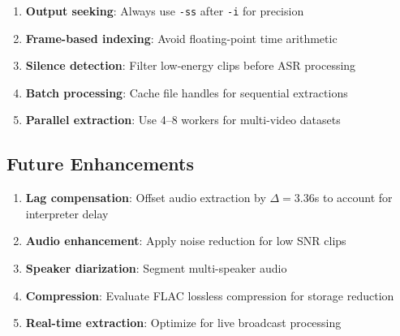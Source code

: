 \documentclass[11pt,a4paper]{article}
\begin{document}
\begin{enumerate}
    \item \textbf{Output seeking}: Always use \texttt{-ss} after \texttt{-i} for precision
    \item \textbf{Frame-based indexing}: Avoid floating-point time arithmetic
    \item \textbf{Silence detection}: Filter low-energy clips before ASR processing
    \item \textbf{Batch processing}: Cache file handles for sequential extractions
    \item \textbf{Parallel extraction}: Use 4--8 workers for multi-video datasets
\end{enumerate}

\subsection{Future Enhancements}

\begin{enumerate}
    \item \textbf{Lag compensation}: Offset audio extraction by $\Delta = 3.36$s to account for interpreter delay
    \item \textbf{Audio enhancement}: Apply noise reduction for low SNR clips
    \item \textbf{Speaker diarization}: Segment multi-speaker audio
    \item \textbf{Compression}: Evaluate FLAC lossless compression for storage reduction
    \item \textbf{Real-time extraction}: Optimize for live broadcast processing
\end{enumerate}
\end{document}
